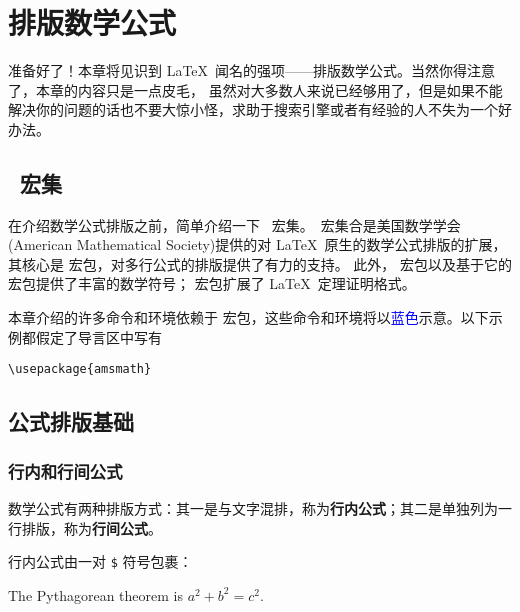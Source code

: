 \chapter{排版数学公式}\label{chap:math}

\begin{intro}
准备好了！本章将见识到 \LaTeX\ 闻名的强项——排版数学公式。当然你得注意了，本章的内容只是一点皮毛，
虽然对大多数人来说已经够用了，但是如果不能解决你的问题的话也不要大惊小怪，求助于搜索引擎或者有经验的人不失为一个好办法。
\end{intro}
\DeclareRobustCommand*\amscmd[1]{\textcolor{blue}{\cmd{#1}}}
\DeclareRobustCommand*\amsenv[1]{\textcolor{blue}{\env{#1}}}

\section{\AmS\ 宏集}\label{sec:ams-bundle}

在介绍数学公式排版之前，简单介绍一下 \AmS\ 宏集。\AmS\ 宏集合是美国数学学会(American Mathematical Society)提供的对
\LaTeX\ 原生的数学公式排版的扩展，其核心是  宏包，对多行公式的排版提供了有力的支持。
此外， 宏包以及基于它的  宏包提供了丰富的数学符号； 宏包扩展了 \LaTeX\ 定理证明格式。

本章介绍的许多命令和环境依赖于  宏包，这些命令和环境将以\textcolor{blue}{蓝色}示意。以下示例都假定了导言区中写有
\begin{verbatim}
\usepackage{amsmath}
\end{verbatim}

\section{公式排版基础}\label{sec:math-basics}

\subsection{行内和行间公式}\label{subsec:math-inline-display}

数学公式有两种排版方式：其一是与文字混排，称为\textbf{行内公式}；其二是单独列为一行排版，称为\textbf{行间公式}。

行内公式由一对 \texttt\$ 符号包裹：
\begin{example}
The Pythagorean theorem is
$a^2 + b^2 = c^2$.
\end{example}

